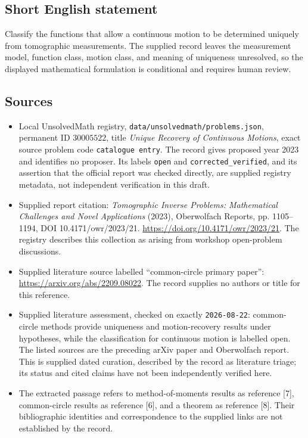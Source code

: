 \documentclass[11pt]{article}
\begin{document}
\subsection{Short English statement}
Classify the functions that allow a continuous motion to be determined uniquely from tomographic measurements. The supplied record leaves the measurement model, function class, motion class, and meaning of uniqueness unresolved, so the displayed mathematical formulation is conditional and requires human review.
\subsection{Sources}
\begin{itemize}
\item Local UnsolvedMath registry, \texttt{data/unsolvedmath/problems.json}, permanent ID \(30005522\), title \emph{Unique Recovery of Continuous Motions}, exact source problem code \texttt{catalogue entry}. The record gives proposed year 2023 and identifies no proposer. Its labels \texttt{open} and \texttt{corrected\_verified}, and its assertion that the official report was checked directly, are supplied registry metadata, not independent verification in this draft.
\item Supplied report citation: \emph{Tomographic Inverse Problems: Mathematical Challenges and Novel Applications} (2023), Oberwolfach Reports, pp. 1105--1194, DOI 10.4171/owr/2023/21. \url{https://doi.org/10.4171/owr/2023/21}. The registry describes this collection as arising from workshop open-problem discussions.
\item Supplied literature source labelled ``common-circle primary paper'': \url{https://arxiv.org/abs/2209.08022}. The record supplies no authors or title for this reference.
\item Supplied literature assessment, checked on exactly \texttt{2026-08-22}: common-circle methods provide uniqueness and motion-recovery results under hypotheses, while the classification for continuous motion is labelled open. The listed sources are the preceding arXiv paper and Oberwolfach report. This is supplied dated curation, described by the record as literature triage; its status and cited claims have not been independently verified here.
\item The extracted passage refers to method-of-moments results as reference [7], common-circle results as reference [6], and a theorem as reference [8]. Their bibliographic identities and correspondence to the supplied links are not established by the record.
\end{itemize}
\end{document}
